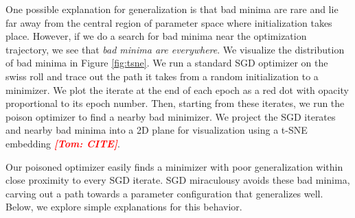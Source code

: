 \documentclass{article}
\newcommand{\tom}[1]{{  \textcolor{red}{\bf \em [Tom: #1]}}}
\begin{document}
  One possible explanation for generalization is that bad minima are rare and lie far away from the central region of parameter space where initialization takes place.  However, if we do a search for bad minima near the optimization trajectory, we see that {\em bad minima are everywhere}.  We visualize the distribution of bad minima in Figure \ref{fig:tsne}. We run a standard SGD optimizer on the swiss roll and trace out the path it takes from a random initialization to a minimizer.  We plot the iterate at the end of each epoch as a red dot with opacity proportional to its epoch number.  Then, starting from these iterates, we run the poison optimizer to find a nearby bad minimizer.  We project the SGD iterates and nearby bad minima into a 2D plane for visualization using a t-SNE embedding \tom{CITE}.

 Our poisoned optimizer easily finds a minimizer with poor generalization within close proximity to every SGD iterate.  SGD miraculousy avoids these bad minima, carving out a path towards a parameter configuration that generalizes well.  Below, we explore simple explanations for this behavior.

\end{document}
